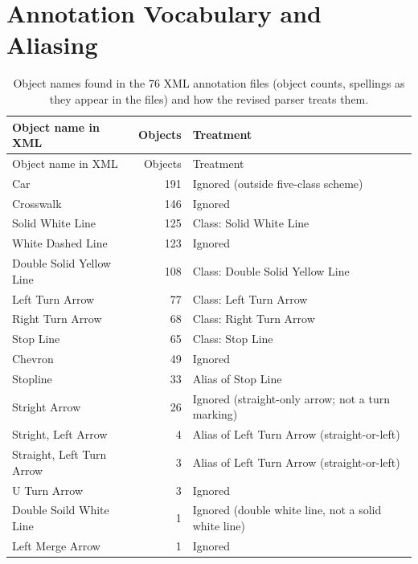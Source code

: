 \documentclass[11pt]{article}
\begin{document}
\clearpage
\section{Annotation Vocabulary and Aliasing}
\begin{longtable}{P{0.34\textwidth} r P{0.44\textwidth}}
\caption{Object names found in the 76 XML annotation files (object counts, spellings as they appear in the files) and how the revised parser treats them.}\label{tab:vocab}\\
\toprule Object name in XML & Objects & Treatment \\
\midrule
\endfirsthead
\toprule Object name in XML & Objects & Treatment \\
\midrule
\endhead
Car & 191 & Ignored (outside five-class scheme) \\
Crosswalk & 146 & Ignored \\
Solid White Line & 125 & Class: Solid White Line \\
White Dashed Line & 123 & Ignored \\
Double Solid Yellow Line & 108 & Class: Double Solid Yellow Line \\
Left Turn Arrow & 77 & Class: Left Turn Arrow \\
Right Turn Arrow & 68 & Class: Right Turn Arrow \\
Stop Line & 65 & Class: Stop Line \\
Chevron & 49 & Ignored \\
Stopline & 33 & Alias of Stop Line \\
Stright Arrow & 26 & Ignored (straight-only arrow; not a turn marking) \\
Stright, Left Arrow & 4 & Alias of Left Turn Arrow (straight-or-left) \\
Straight, Left Turn Arrow & 3 & Alias of Left Turn Arrow (straight-or-left) \\
U Turn Arrow & 3 & Ignored \\
Double Soild White Line & 1 & Ignored (double white line, not a solid white line) \\
Left Merge Arrow & 1 & Ignored \\
\bottomrule
\end{longtable}

\clearpage
\end{document}

